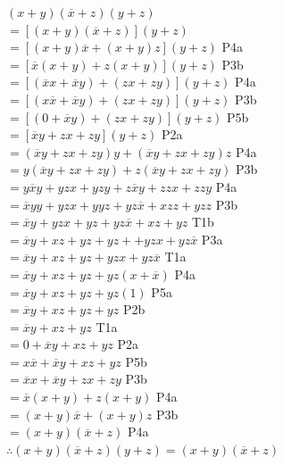 \documentclass[a4paper,12pt]{article}
\begin{document}
\begin{enumerate}[label=\textcolor{teal}{\textbf{\arabic*.}}]
        $(x+y)(\overline{x}+z)(y+z) $\\
        $= [(x+y)(\overline{x}+z)](y+z) $\\
        $= [(x+y)\overline{x} +(x+y)z](y+z) $ P4a\\
        $= [\overline{x}(x+y) +z(x+y)](y+z) $ P3b\\
        $= [(\overline{x}x+\overline{x}y) +(zx+zy)](y+z) $ P4a\\
        $= [(x \overline{x}+\overline{x}y) +(zx+zy)](y+z) $ P3b\\
        $= [(0+\overline{x}y) +(zx+zy)](y+z) $ P5b\\
        $= [\overline{x}y +zx+zy](y+z) $ P2a\\ 
        $= (\overline{x}y +zx+zy)y+(\overline{x}y +zx+zy)z $ P4a\\ 
        $= y(\overline{x}y +zx+zy)+z(\overline{x}y +zx+zy) $ P3b\\
        $= y\overline{x}y +yzx+yzy+z\overline{x}y +zzx+zzy $ P4a\\
        $= \overline{x}yy +yzx+yyz+yz\overline{x} +xzz+yzz $ P3b\\
        $= \overline{x}y +yzx+yz+yz\overline{x} +xz+yz $ T1b\\
        $= \overline{x}y +xz+yz+yz+ +yzx+yz\overline{x} $ P3a\\
        $= \overline{x}y +xz+yz +yzx+yz\overline{x} $  T1a\\
        $= \overline{x}y +xz+yz +yz(x+\overline{x}) $  P4a\\
        $= \overline{x}y +xz+yz +yz(1) $  P5a\\
        $= \overline{x}y +xz+yz +yz$  P2b\\
        $= \overline{x}y +xz+yz$  T1a\\
        $= 0 +\overline{x}y +xz+yz$  P2a\\
        $= x\overline{x} +\overline{x}y +xz+yz$  P5b\\
        $= \overline{x}x +\overline{x}y +zx+zy$  P3b\\
        $= \overline{x}(x +y) +z(x+y)$  P4a\\
        $= (x +y)\overline{x} +(x+y)z$  P3b\\
        $= (x +y)(\overline{x} +z)$  P4a\\

        $\therefore(x+y)(\overline{x}+z)(y+z)=(x+y)(\overline{x}+z)$\\


\end{enumerate}
\end{document}
